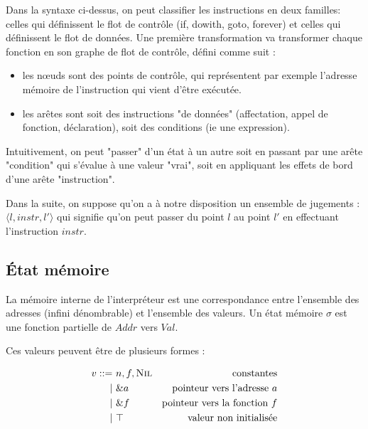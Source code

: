 Dans la syntaxe ci-dessus, on peut classifier les instructions en deux familles:
celles qui définissent le flot de contrôle (if, dowith, goto, forever) et celles
qui définissent le flot de données. Une première transformation va transformer
chaque fonction en son graphe de flot de contrôle, défini comme suit :

\begin{itemize}
\item
  les nœuds sont des points de contrôle, qui représentent par exemple
  l'adresse mémoire de l'instruction qui vient d'être exécutée.
\item
  les arêtes sont soit des instructions "de données" (affectation,
  appel de fonction, déclaration), soit des conditions (ie une
  expression).
\end{itemize}

\begin{minipage}{0.5\textwidth}

\end{minipage}
\begin{minipage}{0.5\textwidth}

\end{minipage}



Intuitivement, on peut "passer" d'un état à un autre soit en passant par une
arête "condition" qui s'évalue à une valeur "vrai", soit en appliquant les
effets de bord d'une arête "instruction".

Dans la suite, on suppose qu'on a à notre disposition un ensemble de jugements :
$\langle l, instr, l' \rangle$ qui signifie qu'on peut passer du point $l$ au
point $l'$ en effectuant l'instruction $instr$.

\subsection{État mémoire}

La mémoire interne de l'interpréteur est une correspondance entre l'ensemble des
adresses (infini dénombrable) et l'ensemble des valeurs. Un état mémoire $σ$ est
une fonction partielle de $Addr$ vers $Val$.

Ces valeurs peuvent être de plusieurs formes :

\begin{align*}
v   ::=~ & n, f, \textsc{Nil} & \text{constantes}\\
      |~ & \&a         & \text{pointeur vers l'adresse $a$}\\
      |~ & \&f         & \text{pointeur vers la fonction $f$}\\
      |~ & \top        & \text{valeur non initialisée}
\end{align*}

